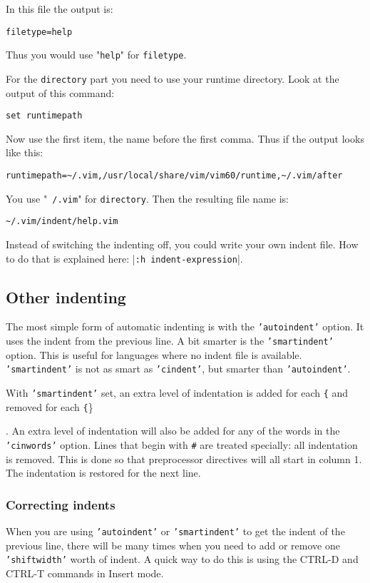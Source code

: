 {{In this file the output is:

\begin{Verbatim}[samepage=true]
    filetype=help 
\end{Verbatim}

Thus you would use "\texttt{help}" for \texttt{{filetype}}.

For the \texttt{{directory}} part you need to use your runtime directory.
Look at the output of this command:

\begin{Verbatim}[samepage=true]
 set runtimepath
\end{Verbatim}

Now use the first item, the name before the first comma.
Thus if the output looks like this:

\begin{Verbatim}[samepage=true]
    runtimepath=~/.vim,/usr/local/share/vim/vim60/runtime,~/.vim/after 
\end{Verbatim}

You use "\texttt{~/.vim}" for \texttt{{directory}}.
Then the resulting file name is:

\begin{Verbatim}[samepage=true]
    ~/.vim/indent/help.vim 
\end{Verbatim}

Instead of switching the indenting off, you could write your own indent file.
How to do that is explained here: |\texttt{:h indent-expression}|.
\subsection{Other indenting}
The most simple form of automatic indenting is with the \texttt{'autoindent'} option.
It uses the indent from the previous line.
A bit smarter is the \texttt{'smartindent'} option.
This is useful for languages where no indent file is available.
\texttt{'smartindent'} is not as smart as \texttt{'cindent'}, but smarter than \texttt{'autoindent'}.

With \texttt{'smartindent'} set, an extra level of indentation is added for each \texttt{\{} and removed for each \texttt\{\}}.
An extra level of indentation will also be added for any of the words in the \texttt{'cinwords'} option.
Lines that begin with \texttt{\#} are treated specially: all indentation is removed.
This is done so that preprocessor directives will all start in column 1.
The indentation is restored for the next line.

\subsubsection{Correcting indents}
When you are using \texttt{'autoindent'} or \texttt{'smartindent'} to get the indent of the previous line, there will be many times when you need to add or remove one \texttt{'shiftwidth'} worth of indent.
A quick way to do this is using the CTRL-D and CTRL-T commands in Insert mode.

}
